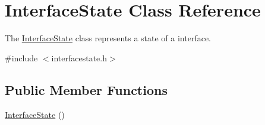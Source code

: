 \hypertarget{class_interface_state}{}\section{Interface\+State Class Reference}
\label{class_interface_state}


The \hyperlink{class_interface_state}{Interface\+State} class represents a state of a interface.  




{\ttfamily \#include $<$interfacestate.\+h$>$}

\subsection*{Public Member Functions}
\begin{DoxyCompactItemize}
\item 
\hyperlink{class_interface_state_a905ac895a279521aa8a76ecd6dce2676}{Interface\+State} ()\hypertarget{class_interface_state_a905ac895a279521aa8a76ecd6dce2676}{}\label{class_interface_state_a905ac895a279521aa8a76ecd6dce2676}


\end{DoxyCompactItemize}
